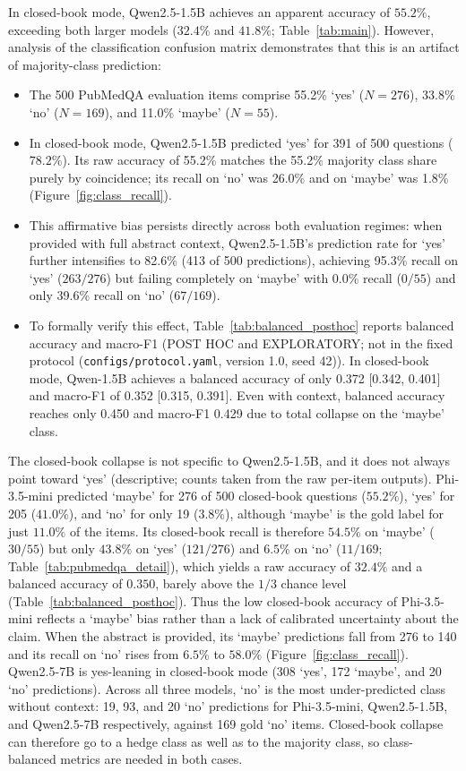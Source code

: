 \documentclass[sigconf,nonacm]{acmart}
\makeatletter
\DeclareRobustCommand{\_}{\ifmmode\nfss@text{\textunderscore}\else\textunderscore\allowbreak\fi}
\newcommand{\protocolfile}{\texttt{configs/\allowbreak protocol.yaml}}
\makeatother
\begin{document}
In closed-book mode, \textsf{Qwen2.5-1.5B} achieves an apparent accuracy of $55.2\%$, exceeding both larger models ($32.4\%$ and $41.8\%$; Table~\ref{tab:main}). However, analysis of the classification confusion matrix demonstrates that this is an artifact of majority-class prediction:
\begin{itemize}
    \item The 500 PubMedQA evaluation items comprise 55.2\% `yes' ($N=276$), 33.8\% `no' ($N=169$), and 11.0\% `maybe' ($N=55$).
    \item In closed-book mode, \textsf{Qwen2.5-1.5B} predicted `yes' for 391 of 500 questions ($78.2\%$). Its raw accuracy of 55.2\% matches the 55.2\% majority class share purely by coincidence; its recall on `no' was 26.0\% and on `maybe' was 1.8\% (Figure~\ref{fig:class_recall}).
    \item This affirmative bias persists directly across both evaluation regimes: when provided with full abstract context, \textsf{Qwen2.5-1.5B}'s prediction rate for `yes' further intensifies to 82.6\% (413 of 500 predictions), achieving 95.3\% recall on `yes' ($263/276$) but failing completely on `maybe' with 0.0\% recall ($0/55$) and only 39.6\% recall on `no' ($67/169$).
    \item To formally verify this effect, Table~\ref{tab:balanced_posthoc} reports balanced accuracy and macro-F1 (POST HOC and EXPLORATORY; not in the fixed protocol (\protocolfile, version 1.0, seed 42)). In closed-book mode, \textsf{Qwen-1.5B} achieves a balanced accuracy of only 0.372 [0.342, 0.401] and macro-F1 of 0.352 [0.315, 0.391]. Even with context, balanced accuracy reaches only 0.450 and macro-F1 0.429 due to total collapse on the `maybe' class.
\end{itemize}

The closed-book collapse is not specific to \textsf{Qwen2.5-1.5B}, and it does not always point toward `yes' (descriptive; counts taken from the raw per-item outputs). \textsf{Phi-3.5-mini} predicted `maybe' for 276 of 500 closed-book questions ($55.2\%$), `yes' for 205 ($41.0\%$), and `no' for only 19 ($3.8\%$), although `maybe' is the gold label for just $11.0\%$ of the items. Its closed-book recall is therefore $54.5\%$ on `maybe' ($30/55$) but only $43.8\%$ on `yes' ($121/276$) and $6.5\%$ on `no' ($11/169$; Table~\ref{tab:pubmedqa_detail}), which yields a raw accuracy of $32.4\%$ and a balanced accuracy of $0.350$, barely above the $1/3$ chance level (Table~\ref{tab:balanced_posthoc}). Thus the low closed-book accuracy of \textsf{Phi-3.5-mini} reflects a `maybe' bias rather than a lack of calibrated uncertainty about the claim. When the abstract is provided, its `maybe' predictions fall from 276 to 140 and its recall on `no' rises from $6.5\%$ to $58.0\%$ (Figure~\ref{fig:class_recall}). \textsf{Qwen2.5-7B} is yes-leaning in closed-book mode (308 `yes', 172 `maybe', and 20 `no' predictions). Across all three models, `no' is the most under-predicted class without context: 19, 93, and 20 `no' predictions for \textsf{Phi-3.5-mini}, \textsf{Qwen2.5-1.5B}, and \textsf{Qwen2.5-7B} respectively, against 169 gold `no' items. Closed-book collapse can therefore go to a hedge class as well as to the majority class, so class-balanced metrics are needed in both cases.
\end{document}

